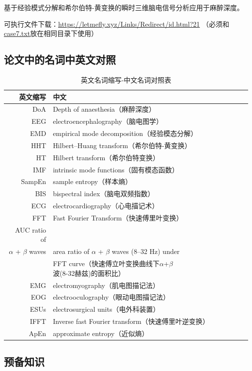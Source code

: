 \documentclass[cs4size,a4paper]{ctexart}
\numberwithin{equation}{section}
\numberwithin{table}{section}
\numberwithin{figure}{section}
\begin{document}
基于经验模式分解和希尔伯特-黄变换的瞬时三维脑电信号分析应用于麻醉深度。

可执行文件下载：\url{https://letmefly.xyz/Links/Redirect/id.html?21} （必须和\href{https://github.com/LetMeFly666/Instantaneous3D_EEG_SignalAnalysis/releases/download/v0.1.0/case7.txt}{case7.txt}放在相同目录下使用）

\subsection{论文中的名词中英文对照}

\begin{table}[H]
\caption{ 英文名词缩写-中文名词对照表}
\centering
\begin{tabular}{r|l}
\toprule
英文缩写 & 中文\\
\midrule[2pt]
DoA & Depth of anaesthesia（麻醉深度）\\
EEG & electroencephalography（脑电图学）\\
EMD & empirical mode decomposition（经验模态分解）\\
HHT & Hilbert–Huang transform（希尔伯特-黄变换）\\
HT & Hilbert transform（希尔伯特变换）\\
IMF & intrinsic mode functions（固有模态函数）\\
SampEn & sample entropy（样本熵）\\
BIS & bispectral index（脑电双频指数）\\
ECG & electrocardiography（心电描记术）\\
FFT & Fast Fourier Transform（快速傅里叶变换）\\
AUC ratio of \\$\alpha$ + $\beta$ waves & area ratio of $\alpha$ + $\beta$ waves (8–32 Hz) under\\ &FFT curve（快速傅立叶变换曲线下$\alpha$+$\beta$波(8-32赫兹)的面积比）\\
EMG & electromyography（肌电图描记法）\\
EOG & electrooculography（眼动电图描记法）\\
ESUs & electrosurgical units（电外科装置）\\
IFFT & Inverse fast Fourier transform（快速傅里叶逆变换）\\
ApEn & approximate entropy（近似熵）\\
\bottomrule
\end{tabular}
\end{table}

\subsection{预备知识}
\end{document}
